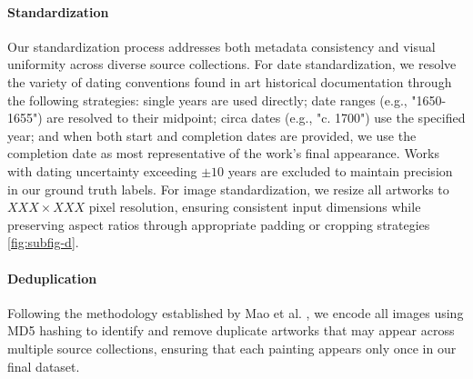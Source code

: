 \documentclass[10pt,twocolumn,letterpaper]{article}
\begin{document}
\paragraph{Standardization} Our standardization process addresses both metadata consistency and visual uniformity across diverse source collections. For date standardization, we resolve the variety of dating conventions found in art historical documentation through the following strategies: single years are used directly; date ranges (e.g., "1650-1655") are resolved to their midpoint; circa dates (e.g., "c. 1700") use the specified year; and when both start and completion dates are provided, we use the completion date as most representative of the work's final appearance. Works with dating uncertainty exceeding $\pm10$ years are excluded to maintain precision in our ground truth labels. For image standardization, we resize all artworks to $XXX\times XXX$ pixel resolution, ensuring consistent input dimensions while preserving aspect ratios through appropriate padding or cropping strategies \ref{fig:subfig-d}.

\paragraph{Deduplication} Following the methodology established by Mao et al. \cite{Mao17}, we encode all images using MD5 hashing to identify and remove duplicate artworks that may appear across multiple source collections, ensuring that each painting appears only once in our final dataset.

\end{document}

